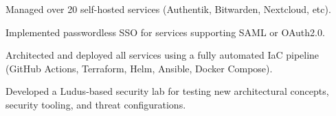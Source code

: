 \item Managed over 20 self-hosted services (Authentik, Bitwarden, Nextcloud, etc).
\item Implemented passwordless SSO for services supporting SAML or OAuth2.0.
\item Architected and deployed all services using a fully automated IaC pipeline (GitHub Actions, Terraform, Helm, Ansible, Docker Compose).
\item Developed a Ludus-based security lab for testing new architectural concepts, security tooling, and threat configurations.

